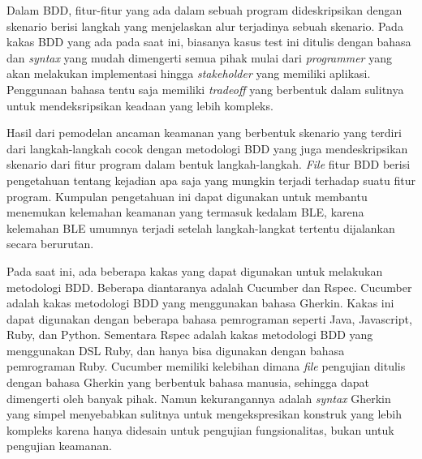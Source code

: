Dalam BDD, fitur-fitur yang ada dalam sebuah program dideskripsikan dengan skenario
berisi langkah yang menjelaskan alur terjadinya sebuah skenario. Pada kakas BDD
yang ada pada saat ini, biasanya kasus test ini ditulis dengan bahasa dan \emph{syntax}
yang mudah dimengerti semua pihak mulai dari \emph{programmer} yang akan melakukan implementasi
hingga \emph{stakeholder} yang memiliki aplikasi. Penggunaan bahasa tentu saja memiliki \emph{tradeoff}
yang berbentuk dalam sulitnya untuk mendeksripsikan keadaan yang lebih kompleks.

Hasil dari pemodelan ancaman keamanan yang berbentuk skenario yang terdiri dari langkah-langkah
cocok dengan metodologi BDD yang juga mendeskripsikan skenario dari fitur program dalam bentuk
langkah-langkah. \emph{File} fitur BDD berisi pengetahuan tentang kejadian apa saja yang mungkin
terjadi terhadap suatu fitur program. Kumpulan pengetahuan ini dapat digunakan untuk
membantu menemukan kelemahan keamanan yang termasuk kedalam BLE, karena kelemahan BLE
umumnya terjadi setelah langkah-langkat tertentu dijalankan secara berurutan.

Pada saat ini, ada beberapa kakas yang dapat digunakan untuk melakukan metodologi BDD.
Beberapa diantaranya adalah Cucumber dan Rspec.
Cucumber adalah kakas metodologi BDD yang menggunakan bahasa Gherkin. Kakas ini dapat
digunakan dengan beberapa bahasa pemrograman seperti Java, Javascript, Ruby, dan Python.
Sementara Rspec adalah kakas metodologi BDD yang menggunakan DSL Ruby, dan hanya bisa
digunakan dengan bahasa pemrograman Ruby.
Cucumber memiliki kelebihan dimana \emph{file} pengujian ditulis dengan bahasa Gherkin
yang berbentuk bahasa manusia, sehingga dapat dimengerti oleh banyak pihak. Namun kekurangannya
adalah \emph{syntax} Gherkin yang simpel menyebabkan sulitnya untuk mengekspresikan konstruk
yang lebih kompleks karena hanya didesain untuk pengujian fungsionalitas, bukan untuk
pengujian keamanan.





